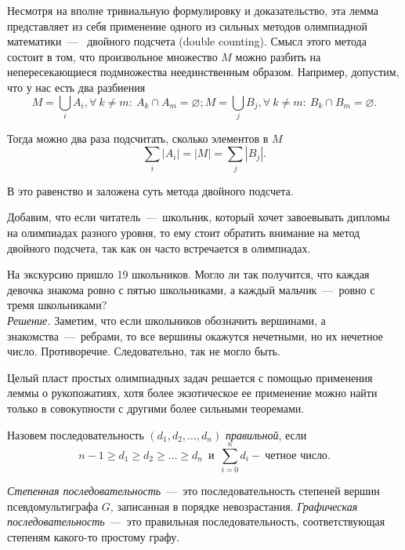 	Несмотря на вполне тривиальную формулировку и доказательство, эта лемма представляет из себя применение одного из сильных методов 
	олимпиадной математики~---~ двойного подсчета (double counting). Смысл этого метода состоит в том, что произвольное множество $M$ 
	можно разбить на непересекающиеся подмножества неединственным образом. Например, допустим, что у нас есть два разбиения 
	$$M = \bigcup_i A_i, \forall \!\ k \neq m \colon \!\ A_k \cap A_m = \varnothing; 
	M = \bigcup_j B_j,  \forall \!\ k \neq m \colon \!\ B_k \cap B_m = \varnothing.$$

	Тогда можно два раза подсчитать, сколько элементов в $M$
	$$\sum_i |A_i| = |M| = \sum_j |B_j|.$$	
	
	В это равенство и заложена суть метода двойного подсчета.
	
	Добавим, что если читатель~---~школьник, который хочет завоевывать дипломы на олимпиадах разного уровня, 
	то ему стоит обратить внимание на метод двойного подсчета, так как он часто встречается в олимпиадах.
	
\begin{example}
	На экскурсию пришло 19 школьников. Могло ли так получится, что каждая девочка знакома ровно с пятью школьниками, 
	а каждый мальчик~---~ровно с тремя школьниками?\\
	
	\emph{Решение.} Заметим, что если школьников обозначить вершинами, а знакомства~---~ребрами, то все 
	вершины окажутся нечетными, но их нечетное число. Противоречие. Следовательно, так не могло быть.
\end{example}

	Целый пласт простых олимпиадных задач решается с помощью применения леммы о рукопожатиях, хотя более экзотическое 
	ее применение можно найти только в совокупности с другими более сильными теоремами. 


\begin{definition}
	Назовем последовательность $(d_1, d_2, \dots, d_n)$ \emph{правильной}, если 
	$$n-1 \geqslant d_1 \geqslant d_2 \geqslant \dots \geqslant d_n \;\ \text{и} \;\ \sum_{i=0}^n d_i - \!\ \text{четное число}.$$  
\end{definition}

\begin{definition}
	\emph{Степенная последовательность}~---~это последовательность степеней вершин псевдомультиграфа $G$, записанная в порядке невозрастания. 
	\emph{Графическая последовательность}~---~это правильная последовательность, соответствующая степеням какого-то простому графу.
\end{definition}

